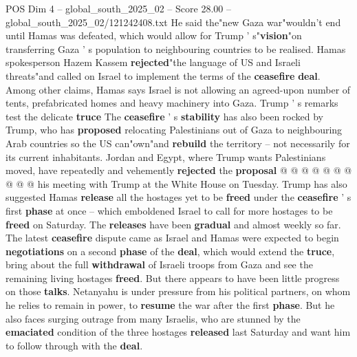\begin{textsample}{POS Dim 4 – global\_south\_2025\_02 – Score 28.00 – global\_south\_2025\_02/121242408.txt}
He said the"new Gaza war"wouldn't end until Hamas was defeated, which would allow for Trump ' s"\textbf{vision}"on transferring Gaza ' s population to neighbouring countries to be realised.
Hamas spokesperson Hazem Kassem \textbf{rejected}"the language of US and Israeli threats"and called on Israel to implement the terms of the \textbf{ceasefire} \textbf{deal}.
Among other claims, Hamas says Israel is not allowing an agreed-upon number of tents, prefabricated homes and heavy machinery into Gaza.
Trump ' s remarks test the delicate \textbf{truce} The \textbf{ceasefire} ' s \textbf{stability} has also been rocked by Trump, who has \textbf{proposed} relocating Palestinians out of Gaza to neighbouring Arab countries so the US can"own"and \textbf{rebuild} the territory -- not necessarily for its current inhabitants.
Jordan and Egypt, where Trump wants Palestinians moved, have repeatedly and vehemently \textbf{rejected} the \textbf{proposal} @ @ @ @ @ @ @ @ @ @ his meeting with Trump at the White House on Tuesday.
Trump has also suggested Hamas \textbf{release} all the hostages yet to be \textbf{freed} under the \textbf{ceasefire} ' s first \textbf{phase} at once -- which emboldened Israel to call for more hostages to be \textbf{freed} on Saturday.
The \textbf{releases} have been \textbf{gradual} and almost weekly so far.
The latest \textbf{ceasefire} dispute came as Israel and Hamas were expected to begin \textbf{negotiations} on a second \textbf{phase} of the \textbf{deal}, which would extend the \textbf{truce}, bring about the full \textbf{withdrawal} of Israeli troops from Gaza and see the remaining living hostages \textbf{freed}.
But there appears to have been little progress on those \textbf{talks}.
Netanyahu is under pressure from his political partners, on whom he relies to remain in power, to \textbf{resume} the war after the first \textbf{phase}.
But he also faces surging outrage from many Israelis, who are stunned by the \textbf{emaciated} condition of the three hostages \textbf{released} last Saturday and want him to follow through with the \textbf{deal}.

\end{textsample}
